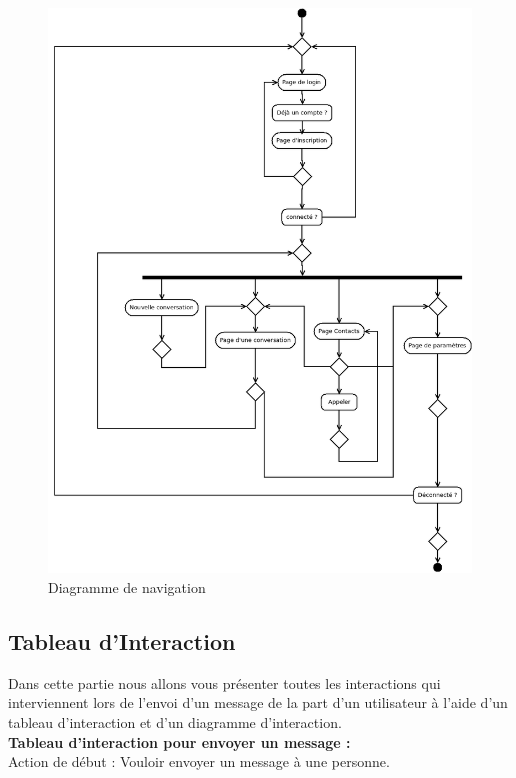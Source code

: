 	\begin{figure}[H]
		\centerline{\includegraphics[width=16.5cm]{img/navigation.png}}
		\caption{Diagramme de navigation}
	\end{figure}


	\subsection{Tableau d’Interaction}
	
	Dans cette partie nous allons vous présenter toutes les interactions qui interviennent lors de l'envoi d'un message de la part d'un utilisateur à l'aide d'un tableau d’interaction et d'un diagramme d’interaction. \\

	\textbf{Tableau d’interaction pour envoyer un message :} \\

	Action de début : Vouloir envoyer un message à une personne. \\

